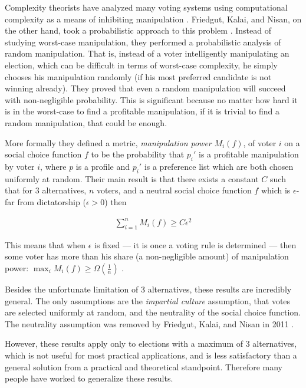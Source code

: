 	Complexity theorists have analyzed many voting systems using computational complexity as a means of inhibiting manipulation \cite{bartholdi1989computational, hemaspaandra2009hybrid}. Friedgut, Kalai, and Nisan, on the other hand, took a probabilistic approach to this problem \cite{friedgut2008elections}. Instead of studying worst-case manipulation, they performed a probabilistic analysis of random manipulation. That is, instead of a voter intelligently manipulating an election, which can be difficult in terms of worst-case complexity, he simply chooses his manipulation randomly (if his most preferred candidate is not winning already). They proved that even a random manipulation will succeed with non-negligible probability. This is significant because no matter how hard it is in the worst-case to find a profitable manipulation, if it is trivial to find a random manipulation, that could be enough.

	More formally they defined a metric, \emph{manipulation power} $M_i(f)$, of voter $i$ on a social choice function $f$ to be the probability that $p_i'$ is a profitable manipulation by voter $i$, where $p$ is a profile and $p_i'$ is a preference list which are both chosen uniformly at random. Their main result is that there exists a constant $C$ such that for 3 alternatives, $n$ voters, and a neutral social choice function $f$ which is $\epsilon$-far from dictatorship ($\epsilon > 0$) then

	\begin{align*}
		\sum_{i=1}^n M_i(f) \ge C \epsilon^2
	\end{align*}

	This means that when $\epsilon$ is fixed --- it is once a voting rule is determined --- then some voter has more than his share (a non-negligible amount) of manipulation power: $\max_i M_i(f) \ge \Omega(\frac{1}{n})$ \cite{friedgut2008elections}.

	Besides the unfortunate limitation of 3 alternatives, these results are incredibly general. The only assumptions are the \emph{impartial culture} assumption, that votes are selected uniformly at random, and the neutrality of the social choice function. The neutrality assumption was removed by Friedgut, Kalai, and Nisan in 2011 \cite{friedgut2011quantitative}.

	However, these results apply only to elections with a maximum of 3 alternatives, which is not useful for most practical applications, and is less satisfactory than a general solution from a practical and theoretical standpoint. Therefore many people have worked to generalize these results.

